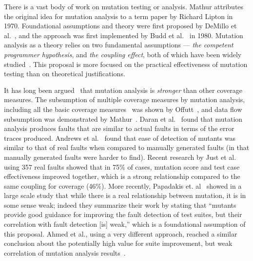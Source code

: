 There is a vast body of work on mutation testing or analysis.  Mathur attributes~\cite{mathur2012foundations} the original idea for mutation analysis
to a term paper by Richard Lipton in 1970. Foundational assumptions and
theory were first proposed by DeMillo et al.~\cite{demillo1978hints},
and the approach was first implemented by Budd et al.~\cite{budd1980theoretical} in 1980.
Mutation analysis as a theory relies on two fundamental
assumptions --- \emph{the competent programmer hypothesis},
and \emph{the coupling effect}, both of which have been widely
studied~\cite{wah2000atheoretical,wah2003ananalysis,gopinath2017the,offutt1989thecoupling,offutt1992investigations,langdon2010efficient,gopinath2017the,gopinath2014mutations}. This
proposal is more focused on the practical effectiveness of
mutation testing than on theoretical justifications.

It has long been argued~\cite{budd1980mutation} that mutation analysis is \emph{stronger}
than other coverage measures. The subsumption of multiple coverage
measures by mutation analysis, including all the basic coverage measures~\cite{myer1979art}
was shown by Offutt~\cite{offutt1996subsumption}, and data flow
subsumption was demonstrated by Mathur~\cite{mathur1994empirical}.
Daran et al.~\cite{daran1996software} found that mutation analysis produces
faults that are similar to actual faults in terms of the error traces produced. Andrews et
al.~\cite{andrews2005mutation,andrews2006using} found that ease of detection
of mutants was similar to that of real faults when compared to manually
generated faults (in that manually generated faults were harder to find).
Recent research by Just et al.~\cite{just2014mutants} using 357 real faults
showed that in 75\% of cases, mutation score and test case
effectiveness improved together, which is a strong relationship
compared to the same coupling for coverage (46\%).  More recently,
Papadakis et. al~\cite{papadakis2018mutation} showed in a large scale study that while there is a
real relationship between mutation, it is in some sense weak; indeed
they summarize their work by stating that ``mutants provide good guidance for improving the
fault detection of test suites, but their correlation with fault
detection [is] weak,'' which is a foundational assumption of this
proposal.  Ahmed et al., using a very different approach, reached a similar
conclusion about the potentially high value for suite improvement, but weak correlation of mutation
analysis results~\cite{ahmed_testedness}.

